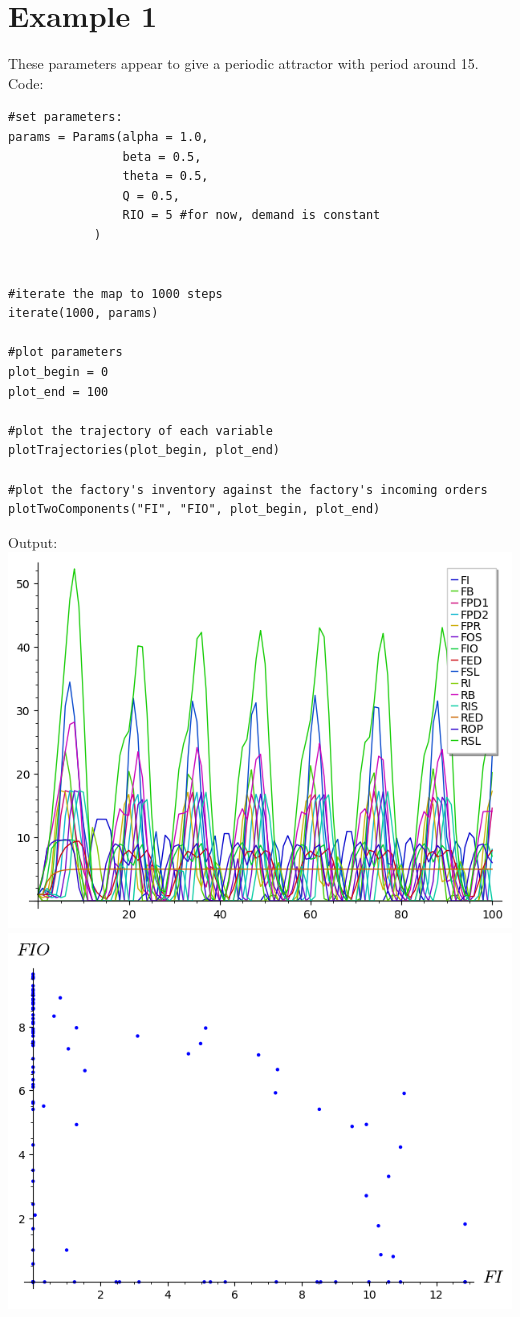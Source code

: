 \documentclass{article}
\begin{document}
\section*{Example 1}
These parameters appear to give a periodic attractor with period around 15.
\linebreak
Code:
\begin{lstlisting}
#set parameters:
params = Params(alpha = 1.0,
				beta = 0.5,
				theta = 0.5,
				Q = 0.5,
				RIO = 5 #for now, demand is constant
			)


#iterate the map to 1000 steps
iterate(1000, params)

#plot parameters
plot_begin = 0
plot_end = 100

#plot the trajectory of each variable 
plotTrajectories(plot_begin, plot_end)

#plot the factory's inventory against the factory's incoming orders
plotTwoComponents("FI", "FIO", plot_begin, plot_end)
\end{lstlisting}
Output:
\linebreak
\includegraphics[scale=1.0]{example1_1.png}
\includegraphics[scale=1.0]{example1_2.png}
\end{document}
